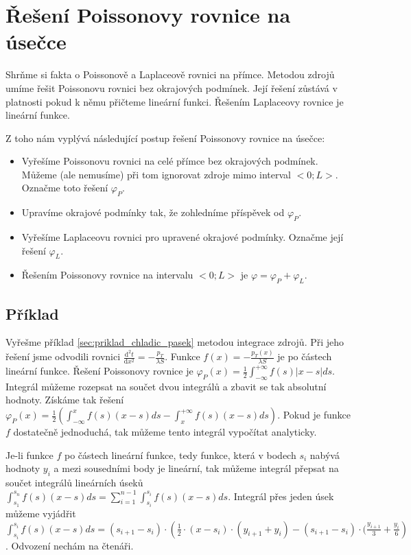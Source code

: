 \documentclass{book}
\begin{document}
\section{Řešení Poissonovy rovnice na úsečce}

Shrňme si fakta o Poissonově a Laplaceově rovnici na přímce. Metodou zdrojů umíme řešit Poissonovu rovnici bez okrajových podmínek. Její řešení
zůstává v platnosti pokud k němu přičteme lineární funkci. Řešením Laplaceovy rovnice je lineární funkce.

Z toho nám vyplývá následující postup řešení Poissonovy rovnice na úsečce:

\begin{itemize}
\item Vyřešíme Poissonovu rovnici na celé přímce bez okrajových podmínek. Můžeme (ale nemusíme) při tom ignorovat zdroje mimo interval \(<0; L>\).
Označme toto řešení \(\varphi_P\).

\item Upravíme okrajové podmínky tak, že zohledníme příspěvek od \(\varphi_P\).

\item Vyřešíme Laplaceovu rovnici pro upravené okrajové podmínky. Označme její řešení \(\varphi_L\).

\item Řešením Poissonovy rovnice na intervalu \(<0; L>\) je \(\varphi = \varphi_P + \varphi_L\).
\end{itemize}

\subsection{Příklad}

Vyřešme příklad \eqref{sec:priklad_chladic_pasek} metodou integrace zdrojů. Při jeho řešení jsme odvodili rovnici \(\frac{\mathrm{d}^2 t}{\mathrm{d}x^2} = -\frac{p_T}{\lambda S}\). Funkce \(f(x) = -\frac{p_T(x)}{\lambda S}\) je po částech lineární funkce.
Řešení Poissonovy rovnice je \(\varphi_P(x) = \frac{1}{2} \int_{-\infty}^{+\infty} f(s) | x - s| ds\). Integrál můžeme rozepsat na součet dvou integrálů
a zbavit se tak absolutní hodnoty. Získáme tak řešení \(\varphi_P(x) = \frac{1}{2} \left(\int_{-\infty}^{x} f(s) (x - s) ds - \int_{x}^{+\infty} f(s) (x - s) ds \right)\). Pokud je funkce \(f\) dostatečně jednoduchá, tak můžeme tento integrál vypočítat analyticky. 

Je-li funkce \(f\) po částech lineární funkce, tedy funkce, která v bodech \(s_i\) nabývá hodnoty \(y_i\) a mezi sousedními body je lineární, tak můžeme
integrál přepsat na součet integrálů lineárních úseků \(\int_{s_1}^{s_n} f(s) (x - s) ds = \sum_{i=1}^{n-1} \int_{s_i}^{s_i} f(s) (x - s) ds\).
Integrál přes jeden úsek můžeme vyjádřit \(\int_{s_i}^{s_i} f(s) (x - s) ds = (s_{i+1} - s_i) \cdot \left(\frac{1}{2} \cdot (x - s_i) \cdot (y_{i+1} + y_i) - (s_{i+1} - s_i) \cdot (\frac{y_{i+1}}{3} + \frac{y_{i}}{6} \right)\). Odvození nechám na čtenáři.
\end{document}

